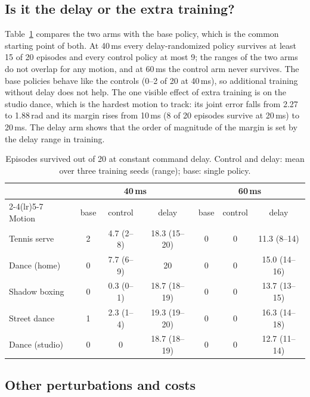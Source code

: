 \documentclass{l4dc2026}
\begin{document}
\subsection{Is it the delay or the extra training?}
\label{sec:attr}

Table~\ref{tab:attr} compares the two arms with the base policy, which is the common starting point of both.
At 40\,ms every delay-randomized policy survives at least 15 of 20 episodes and every control policy at most 9; the ranges of the two arms do not overlap for any motion, and at 60\,ms the control arm never survives.
The base policies behave like the controls (0--2 of 20 at 40\,ms), so additional training without delay does not help.
The one visible effect of extra training is on the studio dance, which is the hardest motion to track: its joint error falls from 2.27 to 1.88\,rad and its margin rises from 10\,ms (8 of 20 episodes survive at 20\,ms) to 20\,ms.
The delay arm shows that the order of magnitude of the margin is set by the delay range in training.

\begin{table}[t]
\centering\small
\begin{tabular}{lccccc c}
\toprule
 & \multicolumn{3}{c}{40\,ms} & \multicolumn{3}{c}{60\,ms}\\
\cmidrule(lr){2-4}\cmidrule(lr){5-7}
Motion & base & control & delay & base & control & delay \\
\midrule
Tennis serve & 2 & 4.7 (2--8) & 18.3 (15--20) & 0 & 0 & 11.3 (8--14) \\
Dance (home) & 0 & 7.7 (6--9) & 20 & 0 & 0 & 15.0 (14--16) \\
Shadow boxing & 0 & 0.3 (0--1) & 18.7 (18--19) & 0 & 0 & 13.7 (13--15) \\
Street dance & 1 & 2.3 (1--4) & 19.3 (19--20) & 0 & 0 & 16.3 (14--18) \\
Dance (studio) & 0 & 0 & 18.7 (18--19) & 0 & 0 & 12.7 (11--14) \\
\bottomrule
\end{tabular}
\caption{Episodes survived out of 20 at constant command delay. Control and delay: mean over three training seeds (range); base: single policy.}
\label{tab:attr}
\end{table}

\subsection{Other perturbations and costs}
\end{document}
